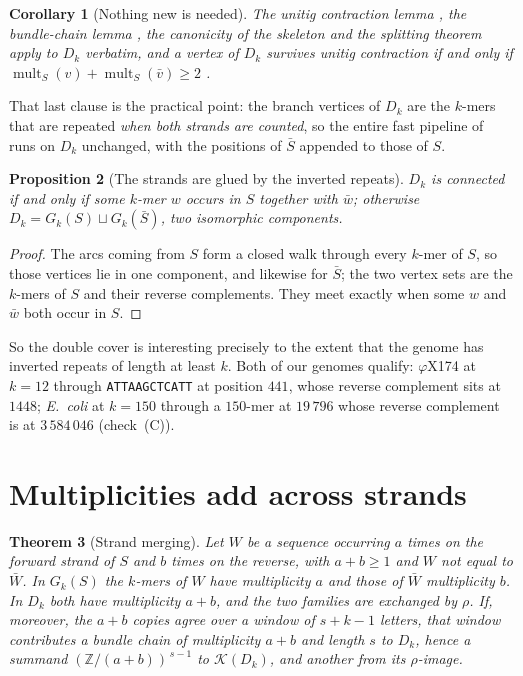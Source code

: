 \documentclass[11pt]{article}
\theoremstyle{plain}
\newtheorem{theorem}{Theorem}
\newtheorem{proposition}[theorem]{Proposition}
\newtheorem{corollary}[theorem]{Corollary}
\theoremstyle{definition}
\theoremstyle{remark}
\newcommand{\Z}{\mathbb{Z}}
\newcommand{\K}{\mathcal{K}}
\newcommand{\mult}{\operatorname{mult}}
\begin{document}
\begin{corollary}[Nothing new is needed]\label{cor:applies}
The unitig contraction lemma \cite[Lem.~4]{Bio1}, the bundle-chain lemma
\cite[Lem.~2]{Bio3}, the canonicity of the skeleton \cite[Lem.~6]{Bio3} and the splitting
theorem \cite[Thm.~5]{Bio3} apply to $D_k$ verbatim, and a vertex of $D_k$ survives unitig
contraction if and only if $\mult_S(v)+\mult_S(\bar v)\ge2$ \cite[Lem.~2.1]{Bio5}.
\end{corollary}

That last clause is the practical point: the branch vertices of $D_k$ are the $k$-mers
that are repeated \emph{when both strands are counted}, so the entire fast pipeline of
\cite{Bio5} runs on $D_k$ unchanged, with the positions of $\bar S$ appended to those of
$S$.

\begin{proposition}[The strands are glued by the inverted repeats]\label{prop:conn}
$D_k$ is connected if and only if some $k$-mer $w$ occurs in $S$ together with $\bar w$;
otherwise $D_k=G_k(S)\sqcup G_k(\bar S)$, two isomorphic components.
\end{proposition}

\begin{proof}
The arcs coming from $S$ form a closed walk through every $k$-mer of $S$, so those
vertices lie in one component, and likewise for $\bar S$; the two vertex sets are the
$k$-mers of $S$ and their reverse complements. They meet exactly when some $w$ and
$\bar w$ both occur in $S$.
\end{proof}

So the double cover is interesting precisely to the extent that the genome has inverted
repeats of length at least $k$. Both of our genomes qualify: $\varphi$X174 at $k=12$
through \texttt{ATTAAGCTCATT} at position $441$, whose reverse complement sits at $1448$;
\emph{E.\ coli} at $k=150$ through a $150$-mer at $19\,796$ whose reverse complement is at
$3\,584\,046$ (check~(C)).

\section{Multiplicities add across strands}\label{sec:merge}

\begin{theorem}[Strand merging]\label{thm:merge}
Let $W$ be a sequence occurring $a$ times on the forward strand of $S$ and $b$ times on the
reverse, with $a+b\ge1$ and $W$ not equal to $\bar W$. In $G_k(S)$ the $k$-mers of $W$
have multiplicity $a$ and those of $\bar W$ multiplicity $b$. In $D_k$ both have
multiplicity $a+b$, and the two families are exchanged by $\rho$. If, moreover, the $a+b$
copies agree over a window of $s+k-1$ letters, that window contributes a bundle chain of
multiplicity $a+b$ and length $s$ to $D_k$, hence a summand $(\Z/(a+b))^{\,s-1}$ to
$\K(D_k)$, and another from its $\rho$-image.
\end{theorem}
\end{document}
